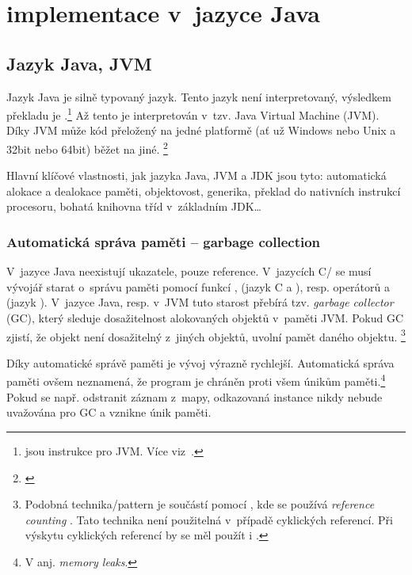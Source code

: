 \chapter{\MIndex{} implementace v~jazyce Java}


\section{Jazyk Java, JVM}

Jazyk Java je silně typovaný jazyk. Tento jazyk není interpretovaný,
výsledkem překladu je \bytecode{}.\footnote{\bytecode{} jsou instrukce pro JVM. Více viz~.} Až tento \bytecode{} je interpretován v~tzv. Java Virtual Machine (JVM).
Díky JVM může kód přeložený na jedné platformě (ať už Windows nebo Unix a 32bit nebo 64bit) běžet na jiné. \footnote{\emph{}\cite{lindholm2013java}}

Hlavní klíčové vlastnosti, jak jazyka Java, JVM a JDK
jsou tyto: automatická alokace a dealokace paměti, objektovost, generika,
překlad \bytecode{} do nativních instrukcí procesoru, bohatá
knihovna tříd v~základním JDK\ldots{}

\subsection{Automatická správa paměti -- garbage collection\label{sec:memorymanagement}}

V~jazyce Java neexistují ukazatele, pouze reference. V~jazycích C/\CC{}
se musí vývojář starat o~správu paměti pomocí funkcí ,
 (jazyk C a \CC), resp. operátorů  a 
(jazyk \CC). V~jazyce Java, resp. v~JVM \cite{lindholm2013java} tuto starost přebírá tzv. \emph{garbage
collector} (GC), který sleduje
dosažitelnost alokovaných objektů v~paměti JVM. Pokud GC
zjistí, že objekt není dosažitelný z~jiných objektů, uvolní pamět daného objektu.
\footnote{Podobná technika/pattern je součástí  pomocí ,
kde se používá \emph{reference counting} \cite{ISO:2012:CPP}. Tato technika není použitelná v~případě cyklických referencí. Při výskytu cyklických referencí by se měl použít i .
}

Díky automatické správě paměti je vývoj výrazně rychlejší.
Automatická správa paměti ovšem neznamená, že program je chráněn proti všem únikům paměti.\footnote{V anj. \emph{memory leaks}.}
Pokud se např.  odstranit záznam z~mapy, odkazovaná instance nikdy nebude uvažována pro GC a vznikne únik paměti.

